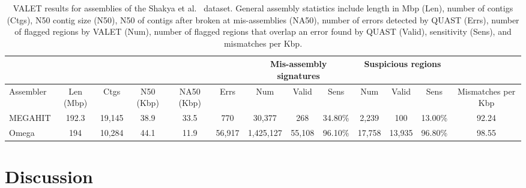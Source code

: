 \documentclass{bioinfo}
\begin{document}
\begin{table}[tb!]
\centering
\footnotesize
\label{synthetic_valet}
\begin{tabular}{|l|c|c|c|c|c|c|c|c|c|c|c|c|}
  \hline
  \multicolumn{6}{|c}{} & \multicolumn{3}{|c|}{Mis-assembly signatures} & \multicolumn{3}{c|}{Suspicious regions}   &  \\
  \hline
  Assembler & Len (Mbp) & Ctgs   & N50 (Kbp) & NA50 (Kbp) & Errs   & Num       & Valid  & Sens    & Num    & Valid  & Sens    & Mismatches per Kbp \\
  \hline
  MEGAHIT   & 192.3     & 19,145 & 38.9      & 33.5       & 770    & 30,377    & 268    & 34.80\% & 2,239  & 100    & 13.00\% & 92.24              \\
  Omega     & 194       & 10,284 & 44.1      & 11.9       & 56,917 & 1,425,127 & 55,108 & 96.10\% & 17,758 & 13,935 & 96.80\% & 98.55 \\
  \hline
\end{tabular}
\caption[VALET results for assemblies of the Shakya et al.~\citep{shakya2013comparative} dataset]{VALET results for assemblies of the Shakya et al.~\citep{shakya2013comparative} dataset. General assembly statistics include length in Mbp (Len), number of contigs (Ctgs), N50 contig size (N50), N50 of contigs after broken at mis-assemblies (NA50), number of errors detected by QUAST (Errs), number of flagged regions by VALET (Num), number of flagged regions that overlap an error found by QUAST (Valid), sensitivity (Sens), and mismatches per Kbp.}
\end{table}


\section{Discussion}

\end{document}
